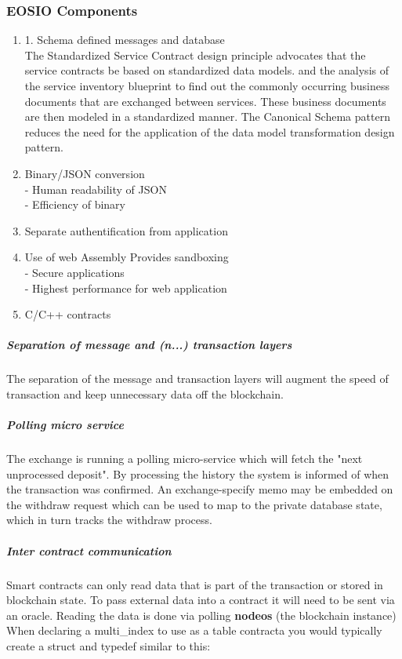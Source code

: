 \documentclass[]{article}
\begin{document}
  \subsubsection{EOSIO Components}
		\begin{enumerate}
			\item 1. Schema defined messages and database \\
			The Standardized Service Contract design principle advocates that the service contracts be based on standardized data models. and the analysis of the service inventory blueprint to find out the commonly occurring business documents that are exchanged between services. These business documents are then modeled in a standardized manner. The Canonical Schema pattern reduces the need for the application of the data model transformation design pattern.			
	
		\item Binary/JSON conversion \\
		- Human readability of JSON \\
		- Efficiency of binary \\
	
		\item Separate authentification from application
	
	\item Use of web Assembly Provides sandboxing   \\
	- Secure applications \\
	- Highest performance for web application\\
	
	\item C/C++ contracts
		
\end{enumerate}
	 
	\subparagraph{	Separation of message and (n...) transaction layers }
	The separation of the message and transaction layers will augment 
	the speed of transaction and keep unnecessary data off the blockchain.
		
	\subparagraph{Polling micro service}
	The exchange is running a polling micro-service which will fetch the "next unprocessed deposit".
	By processing the history the system is informed of when the transaction was confirmed. 
	An exchange-specify memo may be embedded on the withdraw request which can be used to map to the private database state, which in turn tracks the withdraw process.
	

	\subparagraph{Inter contract communication}
	Smart contracts can only read data that is part of the transaction or stored in
	blockchain state. To pass external data into a contract it will need to be sent
	via an oracle. Reading the data is done via polling \textbf{nodeos} (the blockchain instance)
	When declaring a multi\_index to use as a table contracta you would typically create a struct and typedef similar to this:\\
	
\end{document}
